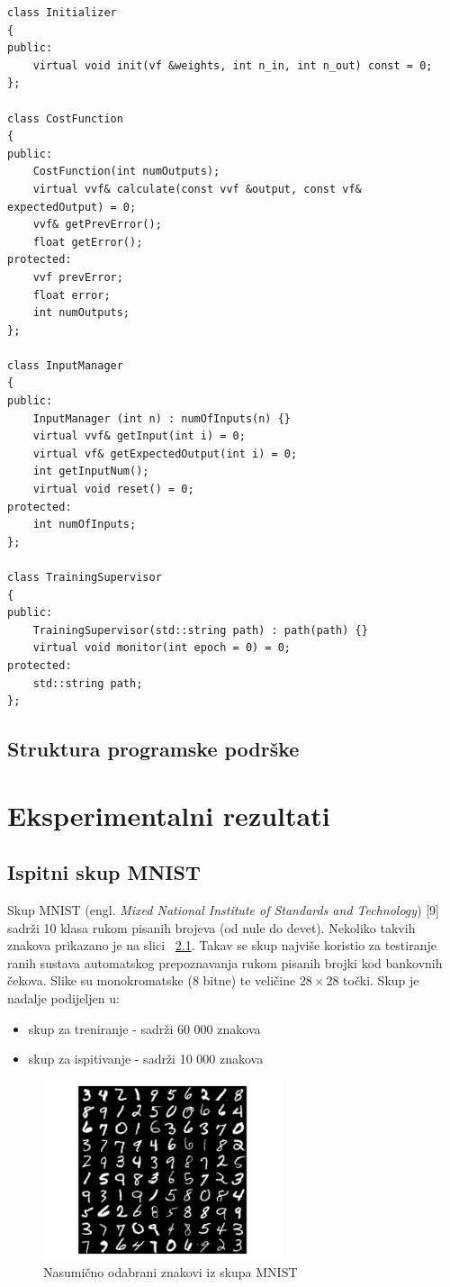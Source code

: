 \documentclass[times, utf8, zavrsni, numeric]{fer}
\begin{document}
\begin{lstlisting}[caption=Pomoćni razredi,
  label=util]
class Initializer
{
public:
    virtual void init(vf &weights, int n_in, int n_out) const = 0;
};

class CostFunction
{
public:
    CostFunction(int numOutputs);
    virtual vvf& calculate(const vvf &output, const vf& expectedOutput) = 0;
    vvf& getPrevError();
    float getError();
protected:
    vvf prevError;
    float error;
    int numOutputs;
};

class InputManager
{
public:
    InputManager (int n) : numOfInputs(n) {}
    virtual vvf& getInput(int i) = 0;
    virtual vf& getExpectedOutput(int i) = 0;
    int getInputNum();
    virtual void reset() = 0;
protected:
    int numOfInputs;
};

class TrainingSupervisor
{
public:
    TrainingSupervisor(std::string path) : path(path) {}
    virtual void monitor(int epoch = 0) = 0;
protected:
    std::string path;
};
\end{lstlisting}

\section{Struktura programske podrške}

\chapter{Eksperimentalni rezultati}

\section{Ispitni skup MNIST}
Skup MNIST (engl. \textit{Mixed National Institute of Standards and Technology}) [9] sadrži
10 klasa rukom pisanih brojeva (od nule do devet). Nekoliko takvih znakova prikazano
je na slici ~\ref{fig:MNIST}. Takav se skup najviše koristio za testiranje ranih sustava automatskog
prepoznavanja rukom pisanih brojki kod bankovnih čekova. Slike su monokromatske
(8 bitne) te veličine $28 \times 28$ točki. Skup je nadalje podijeljen u:
\begin{itemize}
\item skup za treniranje - sadrži 60 000 znakova
\item skup za ispitivanje - sadrži 10 000 znakova
\end{itemize}

\begin{figure}
    \centering
    \includegraphics[width=7cm]{img/mnist-digits.png}
    \caption{Nasumično odabrani znakovi iz skupa MNIST}
    \label{fig:MNIST}
\end{figure}
\end{document}
